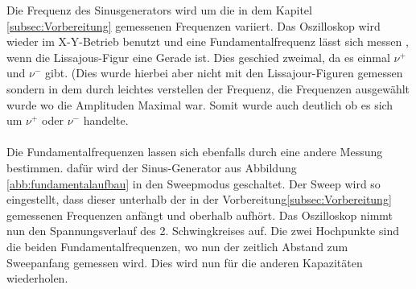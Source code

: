 Die Frequenz des Sinusgenerators wird um
die in dem Kapitel \ref{subsec:Vorbereitung}
gemessenen Frequenzen variiert.
Das Oszilloskop wird wieder im X-Y-Betrieb benutzt
und eine Fundamentalfrequenz lässt sich messen
, wenn die Lissajous-Figur eine Gerade ist.
Dies geschied zweimal, da es einmal $\nu^+$ und
$\nu^-$ gibt. (Dies wurde hierbei aber nicht mit den Lissajour-Figuren gemessen
sondern in dem durch leichtes verstellen der Frequenz, die Frequenzen ausgewählt wurde wo die Amplituden Maximal war.
Somit wurde auch deutlich ob es sich um $\nu^+ $ oder $\nu^-$ handelte.   \\
\\
Die Fundamentalfrequenzen lassen sich
ebenfalls durch eine andere Messung bestimmen.
dafür wird der Sinus-Generator
aus Abbildung \ref{abb:fundamentalaufbau}
in den Sweepmodus geschaltet.
Der Sweep wird so eingestellt, dass dieser unterhalb
der in der Vorbereitung\ref{subsec:Vorbereitung}
gemessenen Frequenzen anfängt
und oberhalb aufhört.
Das Oszilloskop nimmt nun den Spannungsverlauf des
2. Schwingkreises auf. Die zwei Hochpunkte sind die
beiden Fundamentalfrequenzen, wo nun der zeitlich
Abstand zum Sweepanfang gemessen wird.
Dies wird nun für die anderen Kapazitäten wiederholen.
